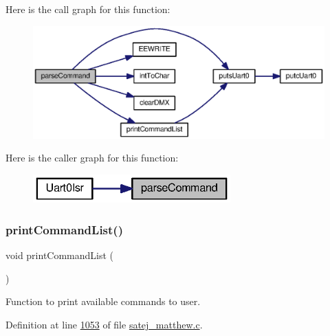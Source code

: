 Here is the call graph for this function\+:
\nopagebreak
\begin{figure}[H]
\begin{center}
\leavevmode
\includegraphics[width=350pt]{satej__matthew_8c_a784ef656236362513864c6ba3507e22d_cgraph}
\end{center}
\end{figure}
Here is the caller graph for this function\+:
\nopagebreak
\begin{figure}[H]
\begin{center}
\leavevmode
\includegraphics[width=215pt]{satej__matthew_8c_a784ef656236362513864c6ba3507e22d_icgraph}
\end{center}
\end{figure}
\mbox{\label{satej__matthew_8c_a9657c6b2d1c183503ca49b71da13e9e4}} 
\subsubsection{\texorpdfstring{printCommandList()}{printCommandList()}}
{\footnotesize\ttfamily void print\+Command\+List (\begin{DoxyParamCaption}{ }\end{DoxyParamCaption})}



Function to print available commands to user. 



Definition at line \mbox{\hyperlink{satej__matthew_8c_source_l01053}{1053}} of file \mbox{\hyperlink{satej__matthew_8c_source}{satej\+\_\+matthew.\+c}}.

